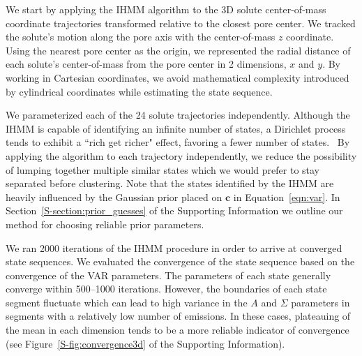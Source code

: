 \documentclass[journal=jpcbfk,manuscript=article]{achemso}
\begin{document}
  
  We start by applying the IHMM algorithm to the 3D solute center-of-mass coordinate 
  trajectories transformed relative to the closest pore center. We tracked the solute's
  motion along the pore axis with the center-of-mass $z$ coordinate. Using the nearest
  pore center as the origin, we represented the radial distance of each solute's 
  center-of-mass from the pore center in 2 dimensions, $x$ and $y$. By working in 
  Cartesian coordinates, we avoid mathematical complexity introduced by cylindrical 
  coordinates while estimating the state sequence.
  
  We parameterized each of the 24 solute trajectories independently.
  Although the IHMM is capable of identifying an infinite number of states, 
  a Dirichlet process tends to exhibit a ``rich get richer" effect, favoring
  a fewer number of states.~\cite{dreyer_discovering_2011} By applying the algorithm to each trajectory 
  independently, we reduce the possibility of lumping together multiple 
  similar states which we would prefer to stay separated before clustering.
  Note that the states identified by the IHMM are heavily influenced by 
  the Gaussian prior placed on $\mathbf{c}$ in Equation~\ref{eqn:var}. 
  In Section~\ref{S-section:prior_guesses} of the Supporting Information we 
  outline our method for choosing reliable prior parameters. 

  We ran 2000 iterations of the IHMM procedure in order to arrive at converged 
  state sequences. We evaluated the convergence of the state sequence based on
  the convergence of the VAR parameters. The parameters of each state
  generally converge within 500--1000 iterations. However, the boundaries of 
  each state segment fluctuate which can lead to high variance in the $A$
  and $\Sigma$ parameters in segments with a relatively low number of emissions.
  In these cases, plateauing of the mean in each dimension tends to be a more 
  reliable indicator of convergence (see Figure~\ref{S-fig:convergence3d} of
  the Supporting Information).
  
\end{document}
